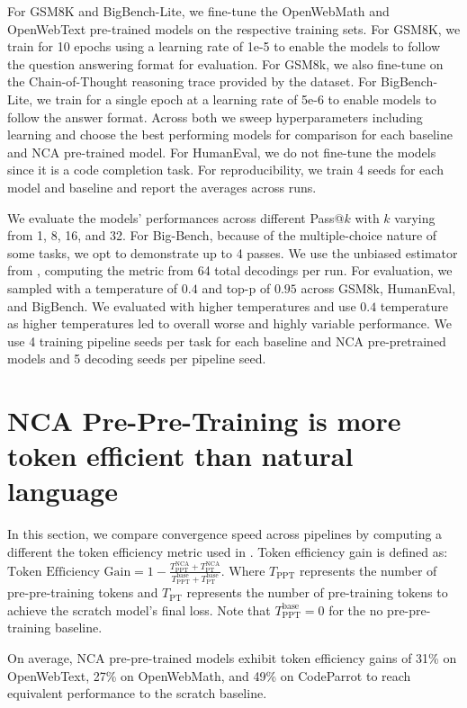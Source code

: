 For GSM8K and BigBench-Lite, we fine-tune the OpenWebMath and OpenWebText pre-trained models on the respective training sets. For GSM8K, we train for 10 epochs using a learning rate of 1e-5 to enable the models to follow the question answering format for evaluation. For GSM8k, we also fine-tune on the Chain-of-Thought reasoning trace provided by the dataset. For BigBench-Lite, we train for a single epoch at a learning rate of 5e-6 to enable models to follow the answer format. Across both we sweep hyperparameters including learning and choose the best performing models for comparison for each baseline and NCA pre-trained model. For HumanEval, we do not fine-tune the models since it is a code completion task. For reproducibility, we train 4 seeds for each model and baseline and report the averages across runs.

We evaluate the models' performances across different Pass@$k$ with $k$ varying from 1, 8, 16, and 32. For Big-Bench, because of the multiple-choice nature of some tasks, we opt to demonstrate up to 4 passes. We use the unbiased estimator from \citet{chen2021evaluating}, computing the metric from 64 total decodings per run. For evaluation, we sampled with a temperature of $0.4$ and top-p of $0.95$ across GSM8k, HumanEval, and BigBench. We evaluated with higher temperatures and use $0.4$ temperature as higher temperatures led to overall worse and highly variable performance. We use 4 training pipeline seeds per task for each baseline and NCA pre-pretrained models and 5 decoding seeds per pipeline seed.


\section{NCA Pre-Pre-Training is more token efficient than natural language}
\label{app:token-efficiency}
In this section, we compare convergence speed across pipelines by computing a different the token efficiency metric used in  \citet{hu2025circuitschomskyprepretrainingformal}. Token efficiency gain is defined as: $\text{Token Efficiency Gain} = 1 - \frac{T_{\text{PPT}}^{\text{NCA}} + T_{\text{PT}}^{\text{NCA}}}{T_{\text{PPT}}^{\text{base}} + T_{\text{PT}}^{\text{base}}}$. Where $T_{\text{PPT}}$ represents the number of pre-pre-training tokens and $T_{\text{PT}}$ represents the number of pre-training tokens to achieve the scratch model's final loss. Note that $T_{\text{PPT}}^{\text{base}} = 0$ for the no pre-pre-training baseline.

On average, NCA pre-pre-trained models exhibit token efficiency gains of 31\% on OpenWebText, 27\% on OpenWebMath, and 49\% on CodeParrot to reach equivalent performance to the scratch baseline.